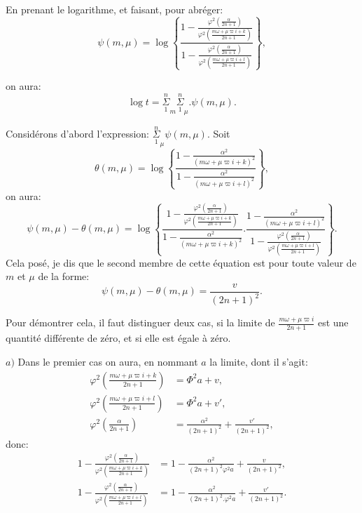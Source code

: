 \documentclass{article}
\begin{document}
En prenant le logarithme, et faisant, pour abréger:
\[ \psi(m,\mu)=\log\left\{\frac{1-\frac{\varphi^{2}\left(\frac{\alpha}{2n+1}\right)}{\varphi^{2}\left(\frac{m\omega+\mu\varpi i+k}{2n+1}\right)}}{1-\frac{\varphi^{2}\left(\frac{\alpha}{2n+1}\right)}{\varphi^{2}\left(\frac{m\omega+\mu\varpi i+l}{2n+1}\right)}}\right\}, \tag{164.} \]

on aura:
\[ \log t=\overset{n}{\underset{1}{\Sigma}}_{m}\overset{n}{\underset{1}{\Sigma}}_{\mu}.\psi(m,\mu). \tag{165.} \]

Considérons d'abord l'expression: $\overset{n}{\underset{1}{\Sigma}}_{\mu}\psi(m,\mu)$. Soit
\[ \theta(m,\mu)=\log\left\{\frac{1-\frac{\alpha^{2}}{(m\omega+\mu\varpi i+k)^{2}}}{1-\frac{\alpha^{2}}{(m\omega+\mu\varpi i+l)^{2}}}\right\}, \tag{166.} \]
on aura:
\[ \psi(m,\mu)-\theta(m,\mu)=\log\left\{\frac{1-\frac{\varphi^{2}\left(\frac{\alpha}{2n+1}\right)}{\varphi^{2}\left(\frac{m\omega+\mu\varpi i+k}{2n+1}\right)}}{1-\frac{\alpha^{2}}{(m\omega+\mu\varpi i+k)^{2}}}.\frac{1-\frac{\alpha^{2}}{(m\omega+\mu\varpi i+l)^{2}}}{1-\frac{\varphi^{2}\left(\frac{\alpha}{2n+1}\right)}{\varphi^{2}\left(\frac{m\omega+\mu\varpi i+l}{2n+1}\right)}}\right\}. \]
Cela posé, je dis que le second membre de cette équation est pour toute valeur de $m$ et $\mu$ de la forme:
\[ \psi(m,\mu)-\theta(m,\mu)=\frac{v}{(2n+1)^{2}}. \]

Pour démontrer cela, il faut distinguer deux cas, si la limite de $\frac{m\omega+\mu\varpi i}{2n+1}$ est une quantité différente de zéro, et si elle est égale à zéro.

$a)$ Dans le premier cas on aura, en nommant $a$ la limite, dont il s'agit:
\[ \begin{aligned}\varphi^{2}\left(\frac{m\omega+\mu\varpi i+k}{2n+1}\right)&=\Phi^{2}a+v,\\ \varphi^{2}\left(\frac{m\omega+\mu\varpi i+l}{2n+1}\right)&=\Phi^{2}a+v',\\ \varphi^{2}\left(\frac{\alpha}{2n+1}\right)&=\frac{\alpha^{2}}{(2n+1)^{2}}+\frac{v'}{(2n+1)^{2}},\end{aligned} \]
donc:
\[ \begin{aligned}1-\frac{\varphi^{2}\left(\frac{\alpha}{2n+1}\right)}{\varphi^{2}\left(\frac{m\omega+\mu\varpi i+k}{2n+1}\right)}&=1-\frac{\alpha^{2}}{(2n+1)^{2}\varphi^{2}a}+\frac{v}{(2n+1)^{2}},\\ 1-\frac{\varphi^{2}\left(\frac{\alpha}{2n+1}\right)}{\varphi^{2}\left(\frac{m\omega+\mu\varpi i+l}{2n+1}\right)}&=1-\frac{\alpha^{2}}{(2n+1)^{2}.\varphi^{2}a}+\frac{v'}{(2n+1)^{2}}.\end{aligned} \]
\end{document}
